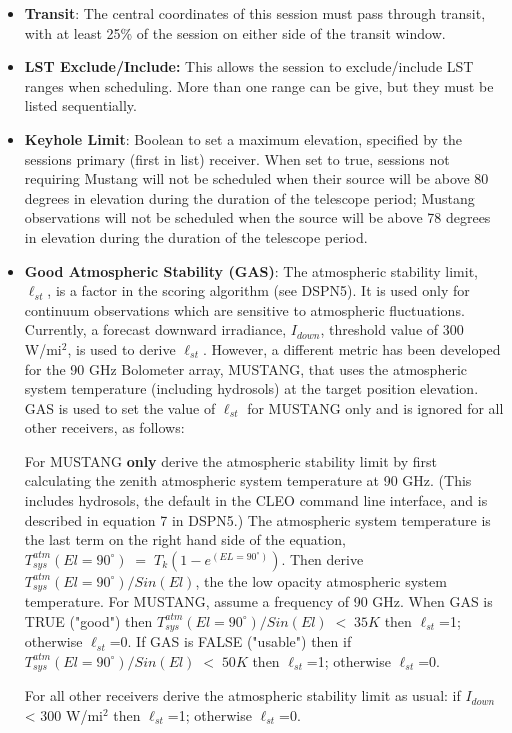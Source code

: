 \begin{itemize}
\item {\bf Transit}:  The central coordinates of this session must pass through transit, with  at least 25\% of the session 
on either side of the transit window.
\item {\bf LST Exclude/Include:} This allows the session to exclude/include LST ranges when scheduling.  More than one range can be give, but they must be listed sequentially.
\item {\bf Keyhole Limit}: Boolean to set a maximum elevation, specified by the sessions
primary (first in list) receiver.  When set to true, sessions not requiring Mustang will not be scheduled
when their source will be above 80 degrees in elevation during the duration of the telescope
period;  Mustang observations will not be scheduled when the source will be above 78 degrees
in elevation during the duration of the telescope period.
\item {\bf Good Atmospheric Stability (GAS)}: The atmospheric stability limit, $\ell_{st}$, is a factor in the scoring algorithm 
(see DSPN5). It is used only for continuum observations which are sensitive to atmospheric fluctuations. Currently, a forecast 
downward irradiance, $I_{down}$, threshold value of 300 W/mi$^2$, is used to derive  $\ell_{st}$.  However, a different metric has been 
developed for the 90 GHz Bolometer array, MUSTANG, that uses the atmospheric system temperature (including hydrosols) at the target 
position elevation.   GAS is used to set the value of $\ell_{st}$ for MUSTANG only and is ignored for all other receivers, as follows:
\begin{itemize}
For MUSTANG {\bf only} derive the atmospheric stability limit by first calculating the zenith atmospheric system temperature at 
90 GHz.  (This includes hydrosols, the default in the CLEO command line interface, and is described in equation 7 in DSPN5.)
The atmospheric system temperature is the last term on the right hand side of the equation, 
$T_{sys}^{atm}(El = 90^\circ)\;=\;T_k(1-e^{(EL=90^\circ)})$. Then derive $T_{sys}^{atm}(El = 90^\circ)/Sin(El)$,  
the the low opacity atmospheric system temperature. For MUSTANG, assume a frequency of 90 GHz. When GAS is TRUE ("good")
then  $T_{sys}^{atm}(El = 90^\circ)/Sin(El)\;<\; 35K$ then $\ell_{st}$=1; otherwise $\ell_{st}$=0.
If GAS is FALSE ("usable") then if  $T_{sys}^{atm}(El = 90^\circ)/Sin(El)\;<\; 50K$ then $\ell_{st}$=1; otherwise $\ell_{st}$=0.
 \end{itemize}
For all other receivers derive the atmospheric stability limit as usual: if $I_{down}$ <  300 W/mi$^2$ then $\ell_{st}$=1; otherwise $\ell_{st}$=0.
\end{itemize}
